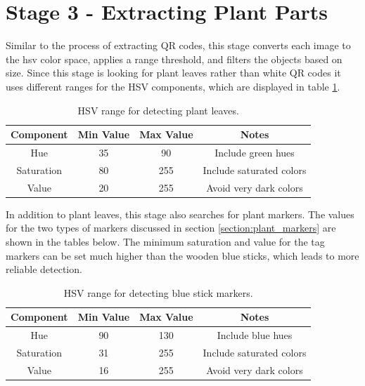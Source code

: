 \section{Stage 3 - Extracting Plant Parts}
\label{processing-stage3}

Similar to the process of extracting QR codes, this stage converts each image to the \ac{hsv} color space, applies a range threshold, and filters the objects based on size.  Since this stage is looking for plant leaves rather than white QR codes it uses different ranges for the HSV components, which are displayed in table \ref{table:plant_leaves_hsv_ranges}.  

\begin{table}[htb]
    \begin{center}
    \caption{HSV range for detecting plant leaves.}
    \begin{tabular}[c]{|c|c|c|c|}
        \hline
        Component & Min Value & Max Value & Notes \\
        \hline
        Hue        & 35  & 90  & Include green hues        \\
        Saturation & 80  & 255 & Include saturated colors  \\
        Value      & 20  & 255 & Avoid very dark colors    \\
        \hline
    \end{tabular}
    \label{table:plant_leaves_hsv_ranges}
   \end{center}
\end{table}

In addition to plant leaves, this stage also searches for plant markers.  The values for the two types of markers discussed in section \ref{section:plant_markers} are shown in the tables below.  The minimum saturation and value for the tag markers can be set much higher than the wooden blue sticks, which leads to more reliable detection.   

\begin{table}[hb]
    \begin{center}
    \caption{HSV range for detecting blue stick markers.}
    \begin{tabular}[c]{|c|c|c|c|}
        \hline
        Component & Min Value & Max Value & Notes \\
        \hline
        Hue        & 90  & 130 & Include blue hues        \\
        Saturation & 31  & 255 & Include saturated colors  \\
        Value      & 16  & 255 & Avoid very dark colors    \\
        \hline
    \end{tabular}
    \label{table:stick_hsv_ranges}
   \end{center}
\end{table}

